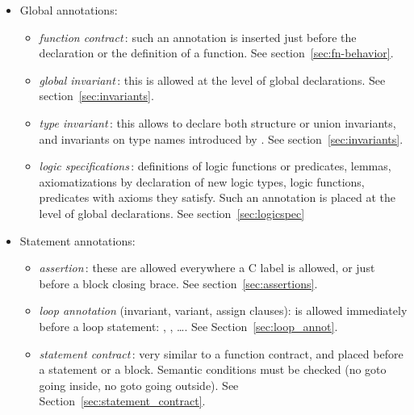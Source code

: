 \begin{itemize}
\item Global annotations:
  \begin{itemize}
  \item \emph{function contract}\,: such an annotation is inserted just before
    the declaration or the definition of a function.
    See section~\ref{sec:fn-behavior}.

  \item \emph{global invariant}\,: this is allowed at the level of
    global declarations. See section~\ref{sec:invariants}.

  \item \emph{type invariant}\,: this allows to declare both structure
    or union invariants, and invariants on type names introduced by
    \typedef.  See section~\ref{sec:invariants}.

  \item \emph{logic specifications}\,: definitions of logic functions
    or predicates, lemmas, axiomatizations by declaration of new logic
    types, logic functions, predicates with axioms they satisfy. Such an
    annotation is placed at the level of global declarations. 
    See section~\ref{sec:logicspec}

  \end{itemize}

\item Statement annotations:
  \begin{itemize}
  \item \emph{assertion}\,: these are allowed
    everywhere a C label is allowed, or just before a
    block closing brace. See section~\ref{sec:assertions}.

  \item \emph{loop annotation} (invariant, variant, assign clauses): is
    allowed immediately before a loop statement: \For, \While,
    \Do\ldots \While. See Section~\ref{sec:loop_annot}.

  \item \emph{statement contract}\,: very similar to a function contract, and
    placed before a statement or a block.  Semantic conditions must
    be checked (no goto going inside, no goto
    going outside).  See Section~\ref{sec:statement_contract}.


\end{itemize}
\end{itemize}
